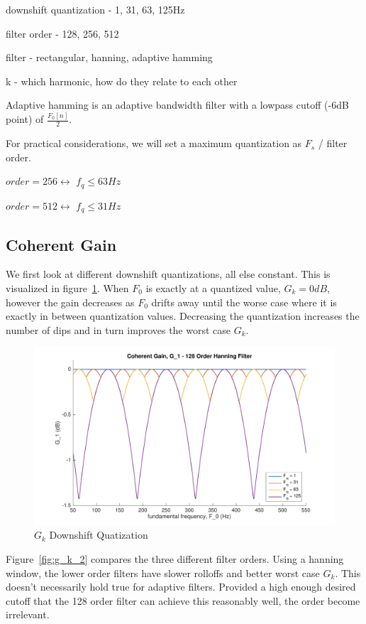 \documentclass [11pt, proquest,oneside] {ganter_thesis}[2015/03/03]
\begin{document}
downshift quantization - 1, 31, 63, 125Hz

filter order - 128, 256, 512

filter - rectangular, hanning, adaptive hamming

k - which harmonic, how do they relate to each other

Adaptive hamming is an adaptive bandwidth filter with a lowpass cutoff (-6dB point) of $\frac{F_0[n]}{2}$.

For practical considerations, we will set a maximum quantization as $F_s$ /  filter order.

$order = 256 \longleftrightarrow$ $f_q \leq 63Hz$

$order = 512 \longleftrightarrow$ $f_q \leq 31Hz$

\subsection{Coherent Gain}

We first look at different downshift quantizations, all else constant.  This is visualized in figure~\ref{fig:g_k_1}.  When $F_0$ is exactly at a quantized value, $G_k = 0dB$, however the gain decreases as $F_0$ drifts away until the worse case where it is exactly in between quantization values.  Decreasing the quantization increases the number of dips and in turn improves the worst case $G_k$.

\begin{figure}[!ht]
  \centering
    \includegraphics[width=1\textwidth]{g_k_1}   
    \caption{$G_k$ Downshift Quatization}\label{fig:g_k_1}
\end{figure}

Figure~\ref{fig:g_k_2} compares the three different filter orders.  Using a hanning window, the lower order filters have slower rolloffs and better worst case $G_k$.  This doesn't necessarily hold true for adaptive filters.  Provided a high enough desired cutoff that the 128 order filter can achieve this reasonably well, the order become irrelevant.
\end{document}
